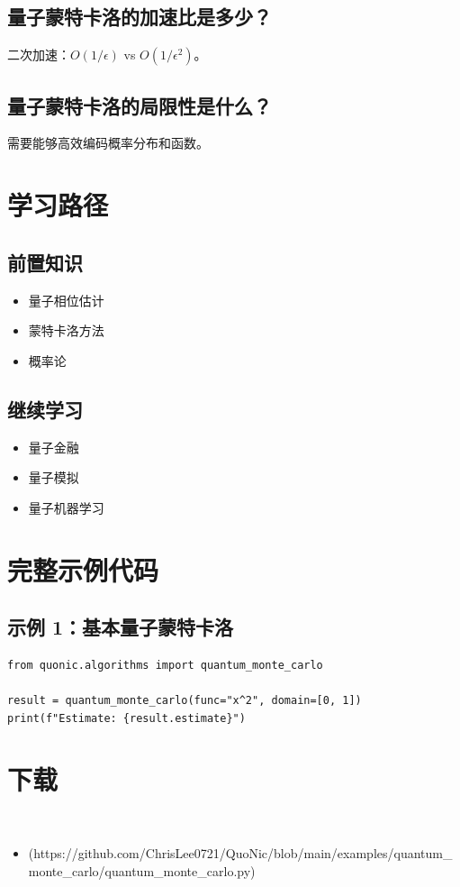 \documentclass[12pt,a4paper]{article}
\begin{document}
\subsection{量子蒙特卡洛的加速比是多少？}

二次加速：$O(1/\epsilon)$ vs $O(1/\epsilon^2)$。

\subsection{量子蒙特卡洛的局限性是什么？}

需要能够高效编码概率分布和函数。

\section{学习路径}

\subsection{前置知识}
\begin{itemize}
  \item 量子相位估计
  \item 蒙特卡洛方法
  \item 概率论
\end{itemize}

\subsection{继续学习}
\begin{itemize}
  \item 量子金融
  \item 量子模拟
  \item 量子机器学习
\end{itemize}

\section{完整示例代码}

\subsection{示例 1：基本量子蒙特卡洛}

\begin{lstlisting}[style=python]
from quonic.algorithms import quantum_monte_carlo

result = quantum_monte_carlo(func="x^2", domain=[0, 1])
print(f"Estimate: {result.estimate}")
\end{lstlisting}


\section{下载}

\begin{itemize}
  \item [quantum_monte_carlo.py](https://github.com/ChrisLee0721/QuoNic/blob/main/examples/quantum_monte_carlo/quantum_monte_carlo.py)
\end{itemize}
\end{document}
